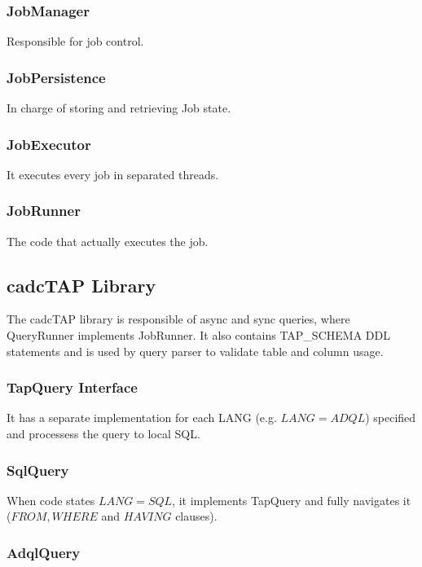 \subsubsection{JobManager}

Responsible for job control.

\subsubsection{JobPersistence}

In charge of storing and retrieving Job state.

\subsubsection{JobExecutor}

It executes every job in separated threads.

\subsubsection{JobRunner}

The code that actually executes the job.


\subsection{cadcTAP Library}

The cadcTAP library is responsible of async and sync queries, where QueryRunner implements JobRunner. It also contains TAP\_SCHEMA DDL statements and is used by query parser to validate table and column usage.

\subsubsection{TapQuery Interface}

It has a separate implementation for each LANG (e.g. $LANG = ADQL$) specified and processess the query to local SQL.

\subsubsection{SqlQuery}

When code states $LANG=SQL$, it implements TapQuery and fully navigates it ($FROM, WHERE$ and $HAVING$ clauses).

\subsubsection{AdqlQuery}

